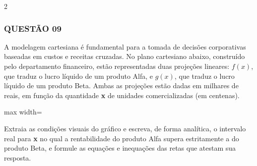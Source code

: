 \documentclass[twoside, 10pt, a4paper]{article}
\begin{document}
\begin{multicols*}{2}
\subsubsection*{QUESTÃO 09}
A modelagem cartesiana é fundamental para a tomada de decisões corporativas baseadas em custos e receitas cruzadas. No plano cartesiano abaixo, construído pelo departamento financeiro, estão representadas duas projeções lineares: $ f(x) $, que traduz o lucro líquido de um produto Alfa, e $ g(x) $, que traduz o lucro líquido de um produto Beta. Ambas as projeções estão dadas em milhares de reais, em função da quantidade \textbf{x} de unidades comercializadas (em centenas).

\begin{center}
\begin{adjustbox}{max width=\linewidth}
\end{adjustbox}
\end{center}

Extraia as condições visuais do gráfico e escreva, de forma analítica, o intervalo real para \textbf{x} no qual a rentabilidade do produto Alfa supera estritamente a do produto Beta, e formule as equações e inequações das retas que atestam sua resposta.


\end{multicols*}
\end{document}
